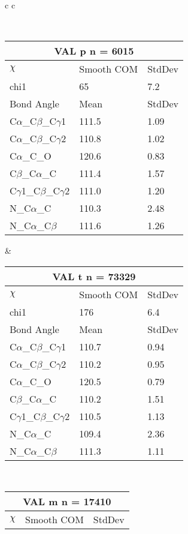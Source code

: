 \begin{longtable}{ c c }

\caption{VAL Central Values}\\
  \begin{tabular}{ l l l }
  \toprule
  \multicolumn{3}{c}{VAL \textbf{p} n = 6015} \\ \toprule
  $\chi$       & Smooth COM & StdDev \\ \midrule
  chi1 & 65 & 7.2 \\ \midrule
  Bond Angle   & Mean     & StdDev \\ \midrule
  C$\alpha$\_C$\beta$\_C$\gamma$1 & 111.5 & 1.09\\
  C$\alpha$\_C$\beta$\_C$\gamma$2 & 110.8 & 1.02\\
  C$\alpha$\_C\_O & 120.6 & 0.83\\
  C$\beta$\_C$\alpha$\_C & 111.4 & 1.57\\
  C$\gamma$1\_C$\beta$\_C$\gamma$2 & 111.0 & 1.20\\
  N\_C$\alpha$\_C & 110.3 & 2.48\\
  N\_C$\alpha$\_C$\beta$ & 111.6 & 1.26\\
  \bottomrule
  \end{tabular}
  &
  \begin{tabular}{ l l l }
  \toprule
  \multicolumn{3}{c}{VAL \textbf{t} n = 73329} \\ \toprule
  $\chi$       & Smooth COM & StdDev \\ \midrule
  chi1 & 176 & 6.4 \\ \midrule
  Bond Angle   & Mean     & StdDev \\ \midrule
  C$\alpha$\_C$\beta$\_C$\gamma$1 & 110.7 & 0.94\\
  C$\alpha$\_C$\beta$\_C$\gamma$2 & 110.2 & 0.95\\
  C$\alpha$\_C\_O & 120.5 & 0.79\\
  C$\beta$\_C$\alpha$\_C & 110.2 & 1.51\\
  C$\gamma$1\_C$\beta$\_C$\gamma$2 & 110.5 & 1.13\\
  N\_C$\alpha$\_C & 109.4 & 2.36\\
  N\_C$\alpha$\_C$\beta$ & 111.3 & 1.11\\
  \bottomrule
  \end{tabular}
  \\
  \begin{tabular}{ l l l }
  \toprule
  \multicolumn{3}{c}{VAL \textbf{m} n = 17410} \\ \toprule
  $\chi$       & Smooth COM & StdDev \\ \midrule

\end{tabular}
\end{longtable}
